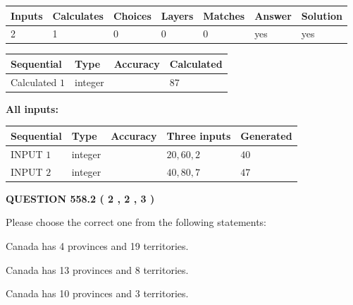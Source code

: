 \documentclass[12pt]{article}
\begin{document}
   
\noindent\begin{tabular}{|l|l|l|l|l|l|l|}
 \hline
Inputs & Calculates & Choices & Layers & Matches & Answer & Solution \\ \hline
 2  & 
 1  & 
 0
  & 
 0  & 
 0  & 
  yes & 
  yes 
  \\ \hline
 \end{tabular}
   
   
   
   
\noindent{}
   
   
  
  
\noindent\begin{tabular}{|l|l|l|l|}
\hline
 Sequential & Type & Accuracy & Calculated \\ 
\hline
 
 
  Calculated $  1 $ & integer &  & 
  $ 87 $ 
 \\  \hline  
 \end{tabular}
   
   
   
   
\noindent\vspace{0.1in}\hspace{-0.08in} {\textbf{\Large{All inputs: }}}
   
   
  
  
\noindent\begin{tabular}{|l|l|l|l|l|}
\hline
 Sequential & Type & Accuracy & Three inputs & Generated \\ 
\hline
 
 
  INPUT $  1 $ & integer &  & $
 20
 , 
 60
 , 
 2
 $ & $ 40 $ 
 \\  \hline  
 
 
  INPUT $  2 $ & integer &  & $
 40
 , 
 80
 , 
 7
 $ & $ 47 $ 
 \\  \hline  
 \end{tabular}
   
   
  
\vspace{0.2in}
  
{\textbf{\Large{QUESTION
558.2 
 ( 2 , 2 , 3 )
}}}
  
  
Please choose the correct one from the following statements:
 
 
Canada has   4 provinces and  19 territories.
 
 
Canada has  13 provinces and  8 territories.
 
 
Canada has 10  provinces and 3 territories.
 
\end{document}
